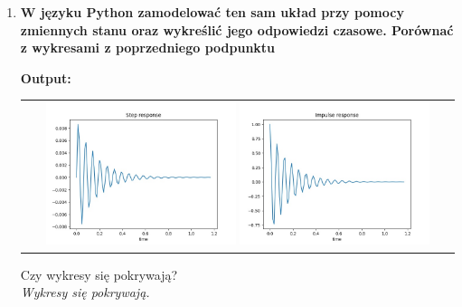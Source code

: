 \documentclass[12pt]{article}
\begin{document}
\begin{enumerate}
            \item\textbf{W języku Python zamodelować ten sam układ przy pomocy zmiennych stanu oraz
            wykreślić jego odpowiedzi czasowe. Porównać z wykresami z poprzedniego podpunktu}
                    \begin{shbox}
                        \centering
                        \textbf{Output:} \\
                        \begin{tabular}{c}
                            \includegraphics[width=0.45\textwidth]{lab2/zad3_2step.jpg}
                            \includegraphics[width=0.45\textwidth]{lab2/zad3_2impulse.jpg}
                        \end{tabular}
                    \end{shbox}
                    Czy wykresy się pokrywają?\\
                    \emph{Wykresy się pokrywają.}


\end{enumerate}
\end{document}
